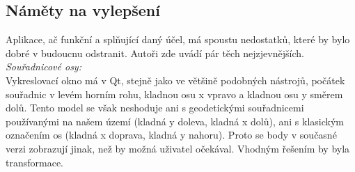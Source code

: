 \documentclass{article}
\begin{document}
	\subsection{Náměty na vylepšení} %
	\indent Aplikace, ač funkční a splňující daný účel, má spoustu nedostatků, které by bylo dobré v budoucnu odstranit. Autoři zde uvádí pár těch nejzjevnějších. \\
	\bigskip \indent \textit{Souřadnicové osy: }
	\\
	 Vykreslovací okno má v Qt, stejně jako ve většině podobných nástrojů, počátek souřadnic v levém horním rohu, kladnou osu x vpravo a kladnou osu y směrem dolů. Tento model se však neshoduje ani s geodetickými souřadnicemi používanými na našem území (kladná y doleva, kladná x dolů), ani s klasickým označením os (kladná x doprava, kladná y nahoru). Proto se body v současné verzi zobrazují jinak, než by možná uživatel očekával. Vhodným řešením by byla transformace. \\
	\bigskip 


\pagestyle{empty}

\clearpage

\end{document}
